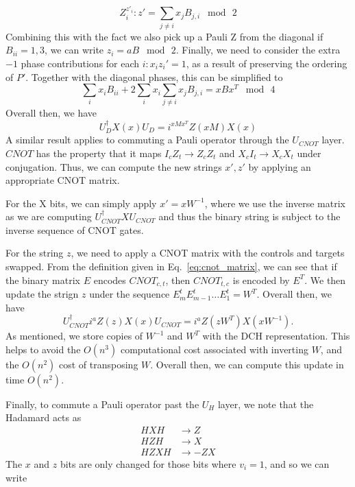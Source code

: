 \[Z_{i}^{z'_{i}}:z' = \sum_{j\neq i}x_{j}B_{j,i}\;\bmod\,2\]
Combining this with the fact we also pick up a Pauli Z from the diagonal if $B_{ii}=1,3$, we can write $z_{i}=aB\;\bmod\,2$. Finally, we need to consider the extra $-1$ phase  contributions for each $i:x_{i}z_{i}'=1$, as a result of preserving the ordering of $P'$. Together with the diagonal phases, this can be simplified to
\[
\sum_{i}x_{i}B_{ii} + 2\sum_{i}x_{i}\sum_{j\neq i}x_{j}B_{j,i} = xBx^{T}\;\bmod\, 4
\]
Overall then, we have
\begin{equation}
U_{D}^{\dagger}X(x)U_{D} = i^{xMx^{T}}Z(xM)X(x)
\label{eq:dch_dupdate}
\end{equation}
A similar result applies to commuting a Pauli operator through the $U_{CNOT}$ layer. $CNOT$ has the property that it maps $I_{c}Z_{t}\rightarrow Z_{c}Z_{t}$ and $X_{c}I_{t}\rightarrow X_{c}X_{t}$ under conjugation. Thus, we can compute the new strings $x',z'$ by applying an appropriate CNOT matrix.\par
For the X bits, we can simply apply $x'=xW^{-1}$, where we use the inverse matrix as we are computing $U_{CNOT}^{\dagger} X U_{CNOT}$ and thus the binary string is subject to the inverse sequence of CNOT gates. \par
For the string $z$, we need to apply a CNOT matrix with the controls and targets swapped. From the definition given in Eq.~\ref{eq:cnot_matrix}, we can see that if the binary matrix $E$ encodes $CNOT_{c,t}$, then $CNOT_{t,c}$ is encoded by $E^{T}$. We then update the strign $z$ under the sequence $E_{m}^{t}E_{m-1}^{t}\dots E_{1}^{t} = W^{T}$. Overall then, we have
\begin{equation}
U_{CNOT}^{\dagger}i^{a}Z(z)X(x)U_{CNOT} = i^{a}Z(zW^{T})X(xW^{-1}).
\label{eq:dch_cupdate}
\end{equation}
As mentioned, we store copies of $W^{-1}$ and $W^{T}$ with the DCH representation. This helps to avoid the $O(n^{3})$ computational cost associated with inverting $W$, and the $O(n^{2})$ cost of transposing $W$. Overall then, we can compute this update in time $O(n^{2})$.\par
Finally, to commute a Pauli operator past the $U_{H}$ layer, we note that the Hadamard acts as
\[
\begin{array}{rcl}
HXH & \rightarrow Z\\
HZH & \rightarrow X\\
HZXH & \rightarrow -ZX
\end{array}
\]
The $x$ and $z$ bits are only changed for those bits where $v_{i}=1$, and so we can write
